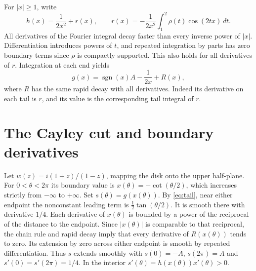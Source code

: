 \documentclass[11pt]{amsart}
\begin{document}
For \(|x|\ge1\), write
\[
 h(x)=\frac1{2x^2}+r(x),\qquad
 r(x)=-\frac1{2x^2}\int_1^2\rho(t)\cos(2tx)\,dt.
\]
All derivatives of the Fourier integral decay faster than every inverse power of \(|x|\). Differentiation introduces powers of \(t\), and repeated integration by parts has zero boundary terms since \(\rho\) is compactly supported. This also holds for all derivatives of \(r\). Integration at each end yields
\begin{equation}\label{eq:tail}
 g(x)=\operatorname{sgn}(x)A-\frac1{2x}+R(x),
\end{equation}
where \(R\) has the same rapid decay with all derivatives. Indeed its derivative on each tail is \(r\), and its value is the corresponding tail integral of \(r\).

\section{The Cayley cut and boundary derivatives}
Let \(w(z)=i(1+z)/(1-z)\), mapping the disk onto the upper half-plane. For \(0<\theta<2\pi\) its boundary value is \(x(\theta)=-\cot(\theta/2)\), which increases strictly from \(-\infty\) to \(+\infty\). Set \(s(\theta)=g(x(\theta))\). By \eqref{eq:tail}, near either endpoint the nonconstant leading term is \(\tfrac12\tan(\theta/2)\). It is smooth there with derivative \(1/4\). Each derivative of \(x(\theta)\) is bounded by a power of the reciprocal of the distance to the endpoint. Since \(|x(\theta)|\) is comparable to that reciprocal, the chain rule and rapid decay imply that every derivative of \(R(x(\theta))\) tends to zero. Its extension by zero across either endpoint is smooth by repeated differentiation. Thus \(s\) extends smoothly with \(s(0)=-A\), \(s(2\pi)=A\) and \(s'(0)=s'(2\pi)=1/4\). In the interior \(s'(\theta)=h(x(\theta))x'(\theta)>0\).
\end{document}
